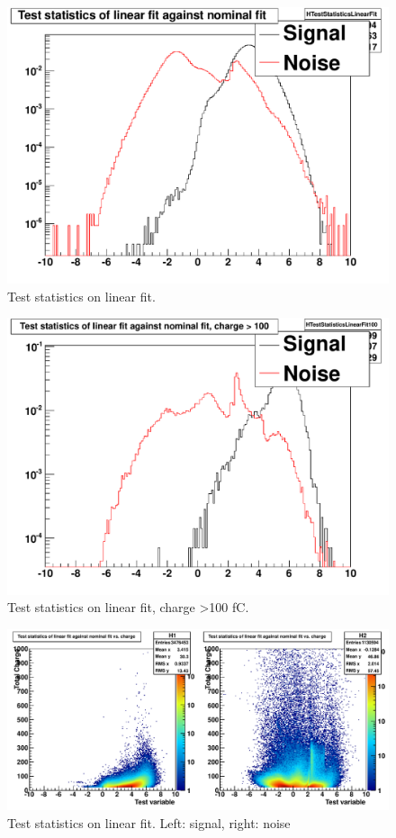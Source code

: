 \begin{figure}
\includegraphics[width=120mm]{DailyLog/6275/6275HTestStatisticsLinearFit.pdf}
\caption{Test statistics on linear fit.}
\label{Figure_6275HTestStatisticsLinearFit}
\end{figure}

\begin{figure}
\includegraphics[width=120mm]{DailyLog/6275/6275HTestStatisticsLinearFit100.pdf}
\caption{Test statistics on linear fit, charge \textgreater 100 fC.}
\label{Figure_6275HTestStatisticsLinearFit100}
\end{figure}

\begin{figure}
\includegraphics[width=120mm]{DailyLog/6275/6275HTestStatisticsLinearFitVsCharge.pdf}
\caption{Test statistics on linear fit.  Left: signal, right: noise}
\label{Figure_6275HTestStatisticsLinearFitVsCharge}
\end{figure}

